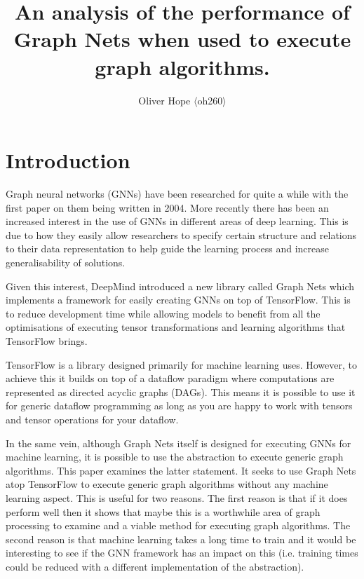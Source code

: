 \documentclass[sigconf,nonacm]{acmart}
\begin{document}
\title{An analysis of the performance of Graph Nets when used to execute graph algorithms.}

\author{Oliver Hope $\langle$oh260$\rangle$}

\renewcommand{\shortauthors}{O. Hope}

\maketitle

\section{Introduction}

Graph neural networks (GNNs) have been researched for quite a while with the first paper on them being written in 2004\cite{first-gnn}. More recently there has been an increased interest in the use of GNNs in different areas of deep learning. This is due to how they easily allow researchers to specify certain structure and relations to their data representation to help guide the learning process and increase generalisability of solutions.

Given this interest, DeepMind introduced a new library called Graph Nets\cite{graph-nets} which implements a framework for easily creating GNNs on top of TensorFlow\cite{tensorflow}. This is to reduce development time while allowing models to benefit from all the optimisations of executing tensor transformations and learning algorithms that TensorFlow brings.

TensorFlow is a library designed primarily for machine learning uses. However, to achieve this it builds on top of a dataflow paradigm where computations are represented as directed acyclic graphs (DAGs). This means it is possible to use it for generic dataflow programming as long as you are happy to work with tensors and tensor operations for your dataflow.

In the same vein, although Graph Nets itself is designed for executing GNNs for machine learning, it is possible to use the abstraction to execute generic graph algorithms. This paper examines the latter statement. It seeks to use Graph Nets atop TensorFlow to execute generic graph algorithms without any machine learning aspect. This is useful for two reasons. The first reason is that if it does perform well then it shows that maybe this is a worthwhile area of graph processing to examine and a viable method for executing graph algorithms. The second reason is that machine learning takes a long time to train and it would be interesting to see if the GNN framework has an impact on this (i.e. training times could be reduced with a different implementation of the abstraction).
\end{document}

